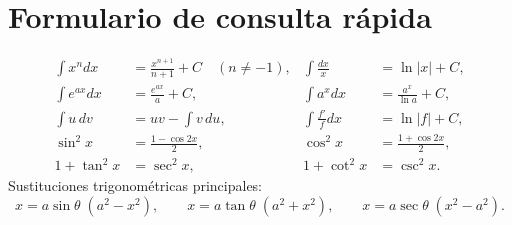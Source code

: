 \documentclass[12pt]{article}
\theoremstyle{definition}\newtheorem{definicion}[teorema]{Definición}\newtheorem{ejemplo}[teorema]{Ejemplo}\newtheorem{ejercicio}[teorema]{Ejercicio}
\theoremstyle{remark}\newtheorem*{observacion}{Observación}\newtheorem*{advertencia}{Advertencia}\newtheorem*{estrategia}{Estrategia}
\begin{document}
\section*{Formulario de consulta rápida}
\begin{align*}
\int x^n dx&=\frac{x^{n+1}}{n+1}+C\quad(n\neq-1),&
\int\frac{dx}{x}&=\ln|x|+C,\\
\int e^{ax}dx&=\frac{e^{ax}}a+C,&
\int a^xdx&=\frac{a^x}{\ln a}+C,\\
\int u\,dv&=uv-\int v\,du,&
\int\frac{f'}f dx&=\ln|f|+C,\\
\sin^2x&=\frac{1-\cos2x}{2},&
\cos^2x&=\frac{1+\cos2x}{2},\\
1+\tan^2x&=\sec^2x,&1+\cot^2x&=\csc^2x.
\end{align*}
Sustituciones trigonométricas principales:
\[x=a\sin\theta\;(a^2-x^2),\qquad x=a\tan\theta\;(a^2+x^2),\qquad x=a\sec\theta\;(x^2-a^2).\]
\end{document}

